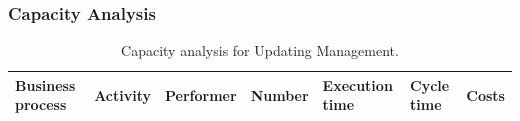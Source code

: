 \subsubsection{Capacity Analysis}


\begin{landscape}
\begin{table}
\centering
{\tiny
\begin{tabular}{|l|l|l|l|l|l|l|}
Business process&Activity&Performer&Number&Execution time&Cycle time&Costs\\
\hline

\end{tabular}
}
\caption{Capacity analysis for Updating Management.}
\end{table}
\end{landscape}
%

%